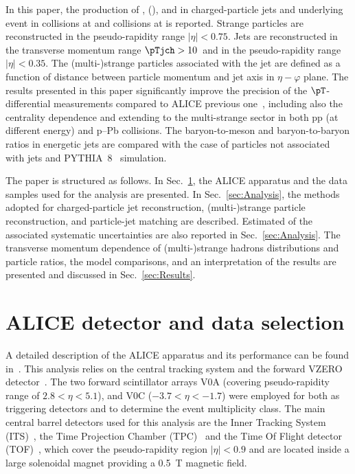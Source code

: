 \documentclass[ALICE,manyauthors]{cernphprep}
\begin{document}
In this paper, the production of \kzero, \lmb (\almb), \Xis and \Oms in charged-particle jets and underlying event in \pp collisions at \thirteen and \pPb collisions at \fivenn is reported.
Strange particles are reconstructed in the pseudo-rapidity range $|\eta| < 0.75$.
Jets are reconstructed in the transverse momentum range $\pTjch > 10$~\GeVc and in the pseudo-rapidity range $|\eta| < 0.35$.
The (multi-)strange particles associated with the jet are defined as a function of distance between particle momentum and jet axis in $\eta-\varphi$ plane.
The results presented in this paper significantly improve the precision of the $\pT$-differential measurements  compared to ALICE previous one~\cite{Acharya:2021oaa}, including also the centrality dependence and extending to the multi-strange sector in both pp (at different energy) and p–Pb collisions.
The baryon-to-meson and baryon-to-baryon ratios in energetic jets are compared with the case of particles not associated with jets and PYTHIA~8~\cite{Sjostrand:2014zea} simulation.

The paper is structured as follows.
In Sec.~\ref{sec:Detector}, the ALICE apparatus and the data samples used for the analysis are presented. In Sec.~\ref{sec:Analysis}, the methods adopted for charged-particle jet reconstruction, (multi-)strange particle reconstruction, and particle-jet matching are described.
Estimated of the associated systematic uncertainties are also reported in Sec.~\ref{sec:Analysis}.
The transverse momentum dependence of (multi-)strange hadrons distributions and particle ratios, the model comparisons, and an interpretation of the results are presented and discussed in Sec.~\ref{sec:Results}.

\section{ALICE detector and data selection}%
\label{sec:Detector}

A detailed description of the ALICE apparatus and its performance can be found in~\cite{Collaboration_2008, Abelev:2014ffa}.
This analysis relies on the central tracking system and the forward VZERO detector~\cite{Abbas:2013taa}.
The two forward scintillator arrays V0A (covering pseudo-rapidity range of $2.8 < \eta < 5.1$), and V0C ($-3.7 < \eta < -1.7$) were employed for both as triggering detectors and to determine the event multiplicity class.
The main central barrel detectors used for this analysis are the Inner Tracking System (ITS)~\cite{Aamodt:2010aa}, the Time Projection Chamber (TPC)~\cite{Alme:2010ke} and the Time Of Flight detector (TOF)~\cite{Akindinov:2004cj, Akindinov:2009zze, Akindinov:2010zzb, Carnesecchi:2018oss}, which cover the pseudo-rapidity region $|\eta| < 0.9$ and are located inside a large solenoidal magnet providing a 0.5~T magnetic field.
\end{document}
